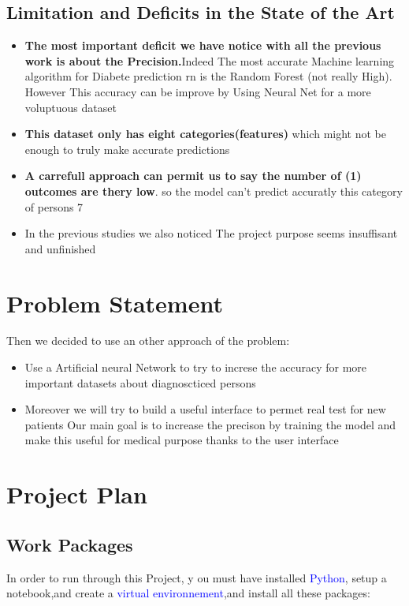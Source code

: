 \documentclass[rnd]{mas_proposal}
\begin{document}
\subsection{Limitation and Deficits in the State of the Art}
\begin{itemize}
    \item \textbf{The most important deficit we have notice with all the previous work is about the Precision.}Indeed The most accurate Machine learning algorithm for Diabete prediction rn is the Random Forest (not really High).
    However This accuracy can be improve by Using Neural Net for a more voluptuous dataset
    \item \textbf{This dataset only has eight categories(features) } which might not be enough to truly make accurate predictions
   \item \textbf{A carrefull approach can permit us to say the number of (1) outcomes are thery
low}. so the model can’t predict accuratly this category of persons
7
\item In the previous studies we also noticed The project purpose seems insuffisant and unfinished 
\end{itemize}

\section{Problem Statement}
Then we decided to use an other approach of the problem:
\begin{itemize}
    \item Use a Artificial neural Network to try to increse the accuracy for more important datasets about diagnoscticed persons
    \item Moreover we will try to build a useful interface to permet real test for new patients
Our main goal is to increase the precison by training the model and make this useful for medical purpose thanks to the user interface
\end{itemize}

\section{Project Plan}

\subsection{Work Packages}
In order to run through this Project, y
ou must have installed \textcolor{blue}{Python},
setup a notebook,and create a  \textcolor{blue}{virtual environnement},and install
  all these packages:
\end{document}
